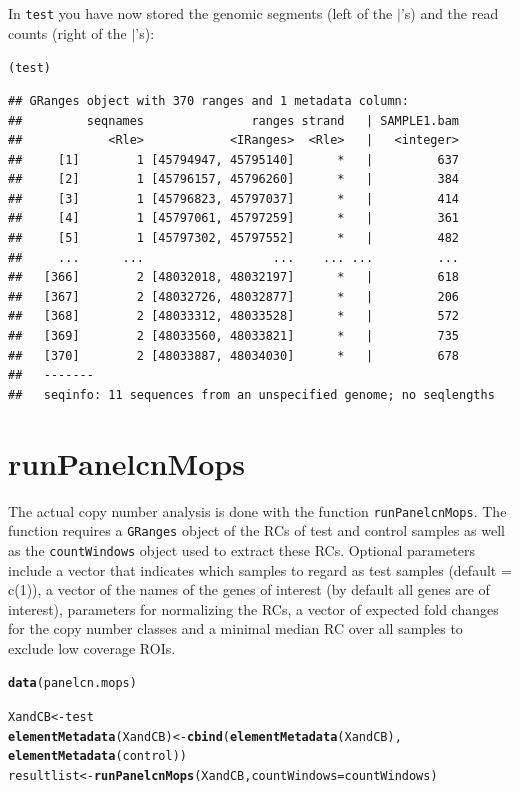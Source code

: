\documentclass[article]{bioinf}\usepackage[]{graphicx}\usepackage[]{color}
\makeatletter
\newcommand{\hlstd}[1]{\textcolor[rgb]{0.345,0.345,0.345}{#1}}%
\newcommand{\hlkwb}[1]{\textcolor[rgb]{0.69,0.353,0.396}{#1}}%
\newcommand{\hlkwc}[1]{\textcolor[rgb]{0.333,0.667,0.333}{#1}}%
\newcommand{\hlkwd}[1]{\textcolor[rgb]{0.737,0.353,0.396}{\textbf{#1}}}%
\newenvironment{kframe}{%
 \def\at@end@of@kframe{}%
 \ifinner\ifhmode%
  \def\at@end@of@kframe{\end{minipage}}%
  \begin{minipage}{\columnwidth}%
 \fi\fi%
 \def\FrameCommand##1{\hskip\@totalleftmargin \hskip-\fboxsep
 \colorbox{shadecolor}{##1}\hskip-\fboxsep
     \hskip-\linewidth \hskip-\@totalleftmargin \hskip\columnwidth}%
 \MakeFramed {\advance\hsize-\width
   \@totalleftmargin\z@ \linewidth\hsize
   \@setminipage}}%
 {\par\unskip\endMakeFramed%
 \at@end@of@kframe}
\newenvironment{knitrout}{}{} %
\makeatother
\begin{document}
In \verb+test+ you have now stored the genomic segments (left of the
$\mid$'s) and the read counts (right of the $\mid$'s):
\begin{knitrout}
\color{fgcolor}\begin{kframe}
\begin{alltt}
\hlstd{(test)}
\end{alltt}
\begin{verbatim}
## GRanges object with 370 ranges and 1 metadata column:
##         seqnames               ranges strand   | SAMPLE1.bam
##            <Rle>            <IRanges>  <Rle>   |   <integer>
##     [1]        1 [45794947, 45795140]      *   |         637
##     [2]        1 [45796157, 45796260]      *   |         384
##     [3]        1 [45796823, 45797037]      *   |         414
##     [4]        1 [45797061, 45797259]      *   |         361
##     [5]        1 [45797302, 45797552]      *   |         482
##     ...      ...                  ...    ... ...         ...
##   [366]        2 [48032018, 48032197]      *   |         618
##   [367]        2 [48032726, 48032877]      *   |         206
##   [368]        2 [48033312, 48033528]      *   |         572
##   [369]        2 [48033560, 48033821]      *   |         735
##   [370]        2 [48033887, 48034030]      *   |         678
##   -------
##   seqinfo: 11 sequences from an unspecified genome; no seqlengths
\end{verbatim}
\end{kframe}
\end{knitrout}

\section{runPanelcnMops}
\label{s:panelcn.mops}
The actual copy number analysis is done with the function \verb+runPanelcnMops+.
The function requires a \verb+GRanges+ object of the RCs of test and control 
samples as well as the \verb+countWindows+ object used to extract these RCs.
Optional parameters include a vector that indicates which samples to regard as 
test samples (default = c(1)), a vector of the names of the genes of interest 
(by default all genes are of interest), parameters for normalizing the RCs, 
a vector of expected fold changes for the copy number classes and a minimal 
median RC over all samples to exclude low coverage ROIs.

\begin{knitrout}
\color{fgcolor}\begin{kframe}
\begin{alltt}
\hlkwd{data}\hlstd{(panelcn.mops)}

\hlstd{XandCB} \hlkwb{<-} \hlstd{test}
\hlkwd{elementMetadata}\hlstd{(XandCB)} \hlkwb{<-} \hlkwd{cbind}\hlstd{(}\hlkwd{elementMetadata}\hlstd{(XandCB),}
                                \hlkwd{elementMetadata}\hlstd{(control))}
\hlstd{resultlist} \hlkwb{<-} \hlkwd{runPanelcnMops}\hlstd{(XandCB,} \hlkwc{countWindows} \hlstd{= countWindows)}
\end{alltt}
\end{kframe}
\end{knitrout}
\end{document}
